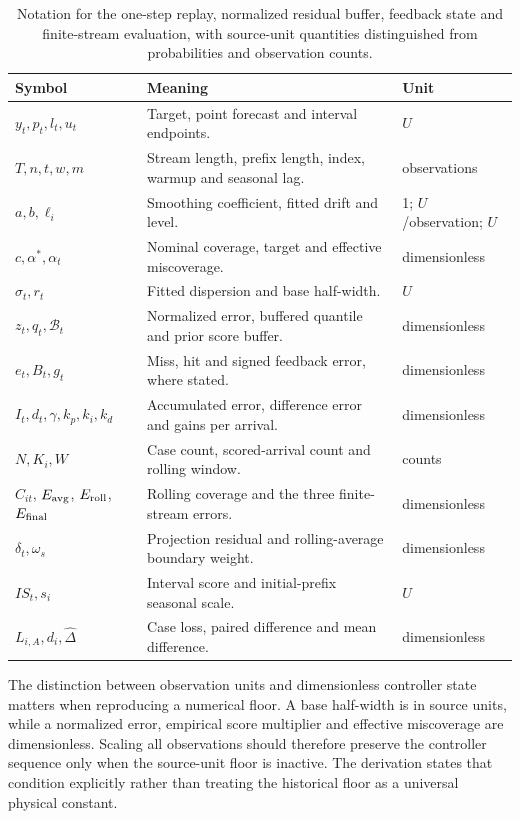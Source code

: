 \begin{table}[htbp]\centering\small
\caption{Notation for the one-step replay, normalized residual buffer, feedback state and finite-stream evaluation, with source-unit quantities distinguished from probabilities and observation counts.}\label{tab:replay-notation}
\begin{tabular}{p{}p{}p{}}\toprule
Symbol & Meaning & Unit\\\midrule
$y_t,p_t,l_t,u_t$ & Target, point forecast and interval endpoints. & $U$\\
$T,n,t,w,m$ & Stream length, prefix length, index, warmup and seasonal lag. & observations\\
$a,b,\ell_i$ & Smoothing coefficient, fitted drift and level. & 1; $U$/observation; $U$\\
$c,\alpha^*,\alpha_t$ & Nominal coverage, target and effective miscoverage. & dimensionless\\
$\hat\sigma_t,r_t$ & Fitted dispersion and base half-width. & $U$\\
$z_t,q_t,\mathcal B_t$ & Normalized error, buffered quantile and prior score buffer. & dimensionless\\
$e_t,B_t,g_t$ & Miss, hit and signed feedback error, where stated. & dimensionless\\
$I_t,d_t,\gamma,k_p,k_i,k_d$ & Accumulated error, difference error and gains per arrival. & dimensionless\\
$N,K_i,W$ & Case count, scored-arrival count and rolling window. & counts\\
$C_{it}$, $E_{\rm avg}$, $E_{\rm roll}$, $E_{\rm final}$ & Rolling coverage and the three finite-stream errors. & dimensionless\\
$\delta_t,\omega_s$ & Projection residual and rolling-average boundary weight. & dimensionless\\
$IS_t,s_i$ & Interval score and initial-prefix seasonal scale. & $U$\\
$L_{i,A},d_i,\widehat\Delta$ & Case loss, paired difference and mean difference. & dimensionless\\
\bottomrule\end{tabular}
\end{table}

The distinction between observation units and dimensionless controller state matters when reproducing a numerical floor. A base half-width is in source units, while a normalized error, empirical score multiplier and effective miscoverage are dimensionless. Scaling all observations should therefore preserve the controller sequence only when the source-unit floor is inactive. The derivation states that condition explicitly rather than treating the historical floor as a universal physical constant.
